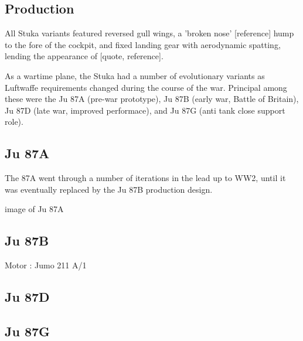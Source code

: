 \documentclass[a4paper, fontsize=11pt]{scrartcl} %
\begin{document}
\subsection{Production}
All Stuka variants featured reversed gull wings, a 'broken nose' [reference]
hump to the fore of the cockpit, and fixed landing gear with aerodynamic
spatting\autocite[p.~4]{curry88}, lending the
appearance of [quote, reference]. %

As a wartime plane, the Stuka had a number of evolutionary variants as
Luftwaffe requirements changed during the course of the war. Principal among these were the Ju 87A
(pre-war prototype), Ju 87B (early war, Battle of Britain), Ju 87D
(late war, improved performace), and Ju 87G (anti tank close support
role).
\subsection{Ju 87A}
The 87A went through a number of iterations in the lead up to WW2,
until it was eventually replaced by the Ju 87B production design.

{image of Ju 87A}
\subsection{Ju 87B}
Motor : Jumo 211 A/1
\subsection{Ju 87D}
\subsection{Ju 87G}
\printbibliography
\end{document}
